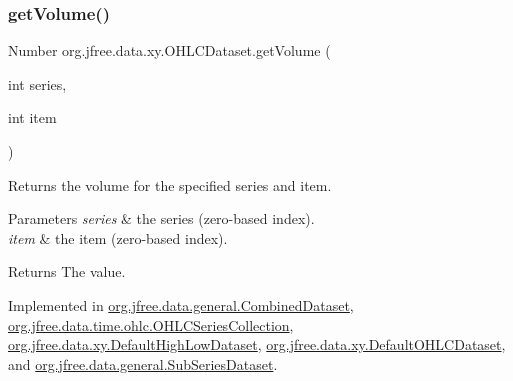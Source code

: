 \subsubsection{\texorpdfstring{get\+Volume()}{getVolume()}}
{\footnotesize\ttfamily Number org.\+jfree.\+data.\+xy.\+O\+H\+L\+C\+Dataset.\+get\+Volume (\begin{DoxyParamCaption}\item[{int}]{series,  }\item[{int}]{item }\end{DoxyParamCaption})}

Returns the volume for the specified series and item.


\begin{DoxyParams}{Parameters}
{\em series} & the series (zero-\/based index). \\
\hline
{\em item} & the item (zero-\/based index).\\
\hline
\end{DoxyParams}
\begin{DoxyReturn}{Returns}
The value. 
\end{DoxyReturn}


Implemented in \mbox{\hyperlink{classorg_1_1jfree_1_1data_1_1general_1_1_combined_dataset_abd11201b4e46155128c2662fc54aa72c}{org.\+jfree.\+data.\+general.\+Combined\+Dataset}}, \mbox{\hyperlink{classorg_1_1jfree_1_1data_1_1time_1_1ohlc_1_1_o_h_l_c_series_collection_a39320d1f0ac295608b343df4bde3b4a6}{org.\+jfree.\+data.\+time.\+ohlc.\+O\+H\+L\+C\+Series\+Collection}}, \mbox{\hyperlink{classorg_1_1jfree_1_1data_1_1xy_1_1_default_high_low_dataset_a36d4aedaf6e8a20597f5127434bc0562}{org.\+jfree.\+data.\+xy.\+Default\+High\+Low\+Dataset}}, \mbox{\hyperlink{classorg_1_1jfree_1_1data_1_1xy_1_1_default_o_h_l_c_dataset_a83b83f0c9bfd31b3b26adc04760cc910}{org.\+jfree.\+data.\+xy.\+Default\+O\+H\+L\+C\+Dataset}}, and \mbox{\hyperlink{classorg_1_1jfree_1_1data_1_1general_1_1_sub_series_dataset_aadeb99143b984112ba4fa142d0c0a931}{org.\+jfree.\+data.\+general.\+Sub\+Series\+Dataset}}.

\mbox{\label{interfaceorg_1_1jfree_1_1data_1_1xy_1_1_o_h_l_c_dataset_a132a37218de3b54bf308b3dcfb93cf84}} 
